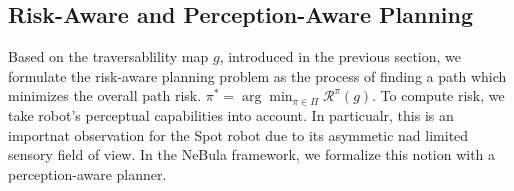 \documentclass[letterpaper, 10pt, conference]{ieeeconf}      %
\newcommand{\ph}[1]{{\textbf{#1}:}} %
\newcommand{\rev}[1]{{\color{blue} #1 }} %
\begin{document}

\subsection{Risk-Aware and Perception-Aware Planning} 
Based on the traversablility map $g$, introduced in the previous section, we formulate the risk-aware planning problem
as the process of finding a path which minimizes the overall path risk. %
$\pi^* = \arg\min_{\pi\in\Pi}\mathcal{R}^{\pi}(g)$.
To compute risk, we take robot's perceptual capabilities into account. In particualr, this is an importnat observation for the Spot robot due to its asymmetic nad limited sensory field of view. %
In the NeBula framework, we formalize this notion with a perception-aware planner.
\end{document}
